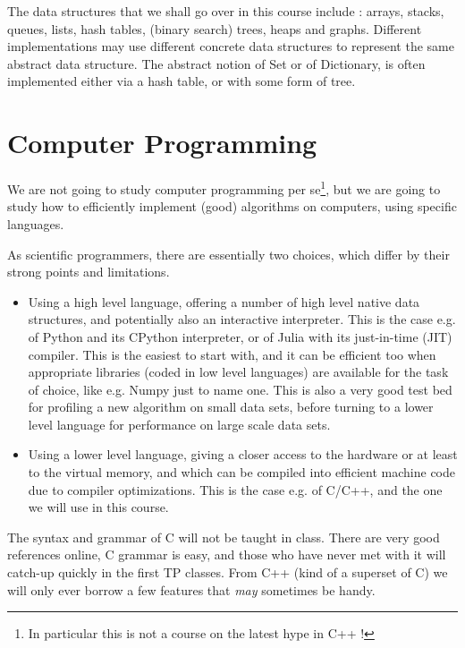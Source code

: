 \documentclass[12pt]{article}
\theoremstyle{plain}
\theoremstyle{remark}
\begin{document}
\bigskip

The data structures that we shall go over in this course include : arrays,
stacks, queues, lists, hash tables, (binary search) trees, heaps and graphs.
Different implementations may use different concrete data structures to 
represent the same abstract data structure. The abstract notion of Set or of
Dictionary, is often implemented either via a hash table, or with some form
of tree. 

\section{Computer Programming}

We are not going to study computer programming per se\footnote{In particular this 
is not a course on the latest hype in C++ !}, but we are going to study how to 
efficiently implement (good) algorithms on computers, using specific languages.

As scientific programmers, there are essentially two choices, which differ by 
their strong points and limitations.
\begin{itemize}
\item Using a high level language, offering a number of high level native data
structures, and potentially also an interactive interpreter. This is the case
e.g. of Python and its CPython interpreter, or of Julia with its 
just-in-time (JIT) compiler. This is the easiest to start with, 
and it can be efficient too when appropriate libraries (coded in low level
languages) are available for the task of choice, like e.g. Numpy just to name
one. This is also a very good test bed for profiling a new algorithm on small
data sets, before turning to a lower level language for performance on large 
scale data sets.
\item Using a lower level language, giving a closer access to the hardware or
at least to the virtual memory, and which can be compiled into efficient machine
code due to compiler optimizations. This is the case e.g. of C/C++, and the
one we will use in this course.
\end{itemize}

The syntax and grammar of C will not be taught in class. There are very good
references online, C grammar is easy, and those who have never met with it 
will catch-up quickly in the first TP classes. From C++ (kind of a superset of
C) we will only ever borrow a few features that {\it may} sometimes be handy.

\medskip
\end{document}
